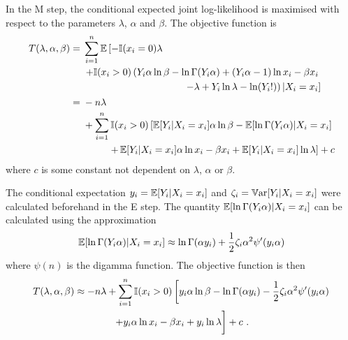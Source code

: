 In the M step, the conditional expected joint log-likelihood is maximised with respect to the parameters $\lambda$, $\alpha$ and $\beta$. The objective function is
\begin{align}
  T(\lambda,\alpha,\beta)&=
  \begin{multlined}[t]
    \sum_{i=1}^n
    \expectation\left[
      -\mathbb{I}(x_i=0)
      \lambda
    \right.
    \\
    \left.+
      \mathbb{I}(x_i>0)
      \left(
        Y_i\alpha\ln\beta-\ln\Gamma(Y_i\alpha)+(Y_i\alpha-1)\ln x_i - \beta x_i
      \right.
    \right.
    \\
    \left.
      \left.  
        - \lambda + Y_i \ln \lambda - \ln(Y_i!)
      \right)
      |X_i=x_i
    \right]
  \end{multlined}
  \nonumber\\
  &=\begin{multlined}[t]
    -n\lambda
    \\
    +\sum_{i=1}^n
    \mathbb{I}(x_i>0)
    \left[
      \expectation[Y_i|X_i=x_i]\alpha\ln\beta-\expectation[\ln\Gamma(Y_i\alpha)|X_i=x_i]
    \right.
    {}\\
    \left.
      +\expectation[Y_i|X_i=x_i]\alpha\ln x_i - \beta x_i
      + \expectation[Y_i|X_i=x_i] \ln \lambda
    \right] + c
  \end{multlined}
\end{align}
where $c$ is some constant not dependent on $\lambda$, $\alpha$ or $\beta$.

The conditional expectation $y_i = \operatorname{\mathbb{E}}[Y_i|X_i=x_i]$ and $\zeta_i = \operatorname{\mathbb{V}ar}[Y_i|X_i=x_i]$ were calculated beforehand in the E step. The quantity $\operatorname{\mathbb{E}}[\ln\Gamma(Y_i\alpha)|X_i=x_i]$ can be calculated using the approximation
\begin{equation}
  \operatorname{\mathbb{E}}[\ln\Gamma(Y_i\alpha)|X_i=x_i] \approx
  \ln\Gamma(\alpha y_i) + \frac{1}{2}\zeta_i\alpha^2\psi'(y_i\alpha)
\end{equation}
where $\psi(n)$ is the digamma function. The objective function is then
\begin{multline}
  T(\lambda,\alpha,\beta)\approx
  -n\lambda
  +\sum_{i=1}^n
  \mathbb{I}(x_i>0)
  \left[
    y_i\alpha\ln\beta-\ln\Gamma(\alpha y_i) - \frac{1}{2}\zeta_i\alpha^2\psi'(y_i\alpha)
  \right.
  \\
  \left.
    +y_i\alpha\ln x_i - \beta x_i
    + y_i \ln \lambda
    \vphantom{\frac{1}{1}}
  \right]
  + c
  \ .
\end{multline}


